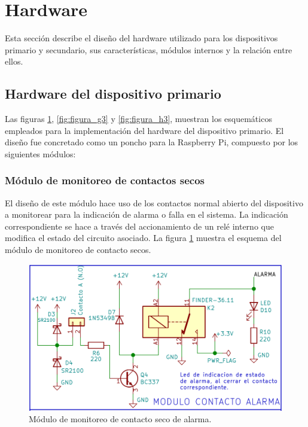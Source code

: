 \section{Hardware}

Esta sección describe el  diseño del hardware utilizado para los dispositivos primario y secundario, sus características, módulos internos y la relación entre ellos.

\subsection{Hardware del dispositivo primario}

Las figuras \ref{fig:figura_f3}, \ref{fig:figura_g3} y \ref{fig:figura_h3}, muestran los esquemáticos empleados para la implementación del hardware del dispositivo primario. El diseño fue concretado como un poncho para la Raspberry Pi, compuesto por los siguientes módulos:

\subsubsection{Módulo de monitoreo de contactos secos}

El diseño de este módulo hace uso de los contactos normal abierto del dispositivo a monitorear para la indicación de alarma o falla en el sistema. La indicación correspondiente se hace a través del accionamiento de un relé interno que modifica el estado del circuito asociado.
La figura \ref{fig:figura_f3} muestra el esquema del módulo de monitoreo de contacto secos.

\begin{figure}[]
	\centering
	\includegraphics[scale=.25]{./Figures/Capitulo3/Fig_F3.png}
	\caption{Módulo de monitoreo de contacto seco de alarma.}
	\label{fig:figura_f3}
\end{figure} 

